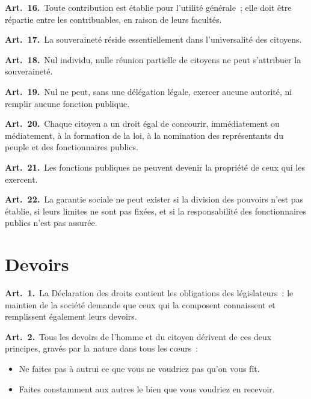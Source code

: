 \documentclass[french,twoside]{book} %
\newcommand{\labelchar}[1]{\textbf{\color{rubric} #1}}
\begin{document}
\labelchar{Art. 16.} Toute contribution est établie pour l’utilité générale ; elle doit être répartie entre les contribuables, en raison de leurs facultés.\par
\labelchar{Art. 17.} La souveraineté réside essentiellement dans l’universalité des citoyens.\par
\labelchar{Art. 18.} Nul individu, nulle réunion partielle de citoyens ne peut s’attribuer la souveraineté.\par
\labelchar{Art. 19.} Nul ne peut, sans une délégation légale, exercer aucune autorité, ni remplir aucune fonction publique.\par
\labelchar{Art. 20.} Chaque citoyen a un droit égal de concourir, immédiatement ou médiatement, à la formation de la loi, à la nomination des représentants du peuple et des fonctionnaires publics.\par
\labelchar{Art. 21.} Les fonctions publiques ne peuvent devenir la propriété de ceux qui les exercent.\par
\labelchar{Art. 22.} La garantie sociale ne peut exister si la division des pouvoirs n’est pas établie, si leurs limites ne sont pas fixées, et si la responsabilité des fonctionnaires publics n’est pas assurée.

\section[{Devoirs}]{Devoirs}

\labelchar{Art. 1.} La Déclaration des droits contient les obligations des législateurs : le maintien de la société demande que ceux qui la composent connaissent et remplissent également leurs devoirs.\par
\labelchar{Art. 2.} Tous les devoirs de l’homme et du citoyen dérivent de ces deux principes, gravés par la nature dans tous les cœurs :\par

\begin{itemize}[itemsep=0pt,topsep=0pt,partopsep=0pt,parskip=0pt]
\item Ne faites pas à autrui ce que vous ne voudriez pas qu’on vous fît.
\item Faites constamment aux autres le bien que vous voudriez en recevoir.
\end{itemize}
\end{document}
